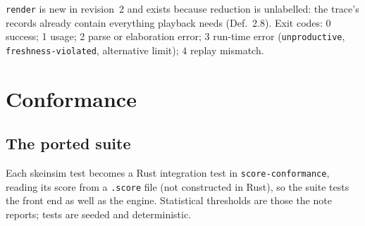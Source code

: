 \documentclass[11pt,a4paper]{article}
\theoremstyle{definition}
\theoremstyle{remark}
\begin{document}
\noindent \texttt{render} is new in revision~2 and exists because reduction is
unlabelled: the trace's records already contain everything playback needs
(Def.~2.8). Exit codes: 0 success; 1 usage; 2 parse or elaboration error; 3
run-time error (\texttt{unproductive}, \texttt{freshness-violated}, alternative
limit); 4 replay mismatch.

\section{Conformance}\label{sec:conformance}

\subsection{The ported suite}

Each skeinsim test becomes a Rust integration test in
\texttt{score-conformance}, reading its score from a \texttt{.score} file (not
constructed in Rust), so the suite tests the front end as well as the engine.
Statistical thresholds are those the note reports; tests are seeded and
deterministic.
\end{document}
